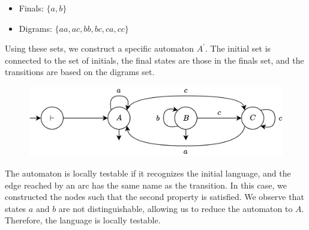 \begin{enumerate}
\begin{itemize}
            \item Finals: $\{a,b\}$
            \item Digrams: $\{aa,ac,bb,bc,ca,cc\}$
        \end{itemize}
        Using these sets, we construct a specific automaton $A^{'}$. 
        The initial set is connected to the set of initials, the final states are those in the finals set, and the transitions are based on the digrams set.
        \begin{figure}[H]
            \centering
            \includegraphics[width=0.75\linewidth]{images/FSA6.png}
        \end{figure}
        The automaton is locally testable if it recognizes the initial language, and the edge reached by an arc has the same name as the transition.
        In this case, we constructed the nodes such that the second property is satisfied.
        We observe that states $a$ and $b$ are not distinguishable, allowing us to reduce the automaton to $A$. 
        Therefore, the language is locally testable.
\end{enumerate}